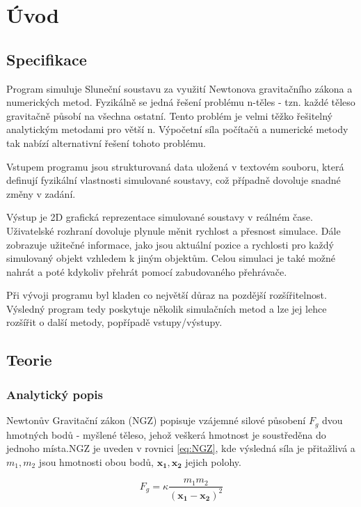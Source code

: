 
\chapter{Úvod}
\label{chap:uvod}

\setcounter{page}{1}
\section{Specifikace}
Program simuluje Sluneční soustavu za využití Newtonova gravitačního zákona a numerických metod. Fyzikálně se jedná řešení problému n-těles - tzn. každé těleso gravitačně působí na všechna ostatní. Tento problém je velmi těžko řešitelný analytickým metodami pro větší n. Výpočetní síla počítačů a numerické metody tak nabízí alternativní řešení tohoto problému.

Vstupem programu jsou strukturovaná data uložená v textovém souboru, která definují fyzikální vlastnosti simulované soustavy, což případně dovoluje snadné změny v zadání. 

Výstup je 2D grafická reprezentace simulované soustavy v reálném čase. Uživatelské rozhraní dovoluje plynule měnit rychlost a přesnost simulace. Dále zobrazuje užitečné informace, jako jsou aktuální pozice a rychlosti pro každý simulovaný objekt vzhledem k jiným objektům. Celou simulaci je také možné nahrát a poté kdykoliv přehrát pomocí zabudovaného přehrávače.

Při vývoji programu byl kladen co největší důraz na pozdější rozšířitelnost. Výsledný program tedy poskytuje několik simulačních metod a lze jej lehce rozšířit o další metody, popřípadě vstupy/výstupy.

\section{Teorie}
\subsection{Analytický popis}
Newtonův Gravitační zákon (NGZ) popisuje vzájemné silové působení $ {F}_g $ dvou hmotných bodů - myšlené těleso, jehož veškerá hmotnost je soustředěna do jednoho místa.NGZ je uveden v rovnici \eqref{eq:NGZ}, kde výsledná síla je přitažlivá a $ m_1,m_2 $ jsou hmotnosti obou bodů, $ \boldsymbol{x_1,x_2} $ jejich polohy.

\begin{equation}
\label{eq:NGZ}
	{F}_g= \kappa \dfrac{m_1 m_2}{(\boldsymbol{x_1 - x_2})^2} 
\end{equation}


